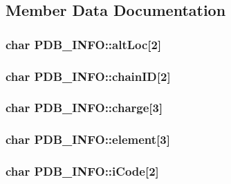 \subsection{Member Data Documentation}
\hypertarget{struct_p_d_b___i_n_f_o_aa6e2a1bcb191da4a47abb0220d3d5495}{
\subsubsection[{alt\-Loc}]{\setlength{\rightskip}{0pt plus 5cm}char P\-D\-B\-\_\-\-I\-N\-F\-O\-::alt\-Loc\mbox{[}2\mbox{]}}}\label{struct_p_d_b___i_n_f_o_aa6e2a1bcb191da4a47abb0220d3d5495}
\hypertarget{struct_p_d_b___i_n_f_o_ac3c03f7d131843da7fce185b73ee5d8d}{
\subsubsection[{chain\-I\-D}]{\setlength{\rightskip}{0pt plus 5cm}char P\-D\-B\-\_\-\-I\-N\-F\-O\-::chain\-I\-D\mbox{[}2\mbox{]}}}\label{struct_p_d_b___i_n_f_o_ac3c03f7d131843da7fce185b73ee5d8d}
\hypertarget{struct_p_d_b___i_n_f_o_a071b12c5f401b4d4328480c92f3e8757}{
\subsubsection[{charge}]{\setlength{\rightskip}{0pt plus 5cm}char P\-D\-B\-\_\-\-I\-N\-F\-O\-::charge\mbox{[}3\mbox{]}}}\label{struct_p_d_b___i_n_f_o_a071b12c5f401b4d4328480c92f3e8757}
\hypertarget{struct_p_d_b___i_n_f_o_a76a5f6c1f8c95f001c8724948a7d4711}{
\subsubsection[{element}]{\setlength{\rightskip}{0pt plus 5cm}char P\-D\-B\-\_\-\-I\-N\-F\-O\-::element\mbox{[}3\mbox{]}}}\label{struct_p_d_b___i_n_f_o_a76a5f6c1f8c95f001c8724948a7d4711}
\hypertarget{struct_p_d_b___i_n_f_o_a95010d5a6d18406f09cb2e1f66134ead}{
\subsubsection[{i\-Code}]{\setlength{\rightskip}{0pt plus 5cm}char P\-D\-B\-\_\-\-I\-N\-F\-O\-::i\-Code\mbox{[}2\mbox{]}}}\label{struct_p_d_b___i_n_f_o_a95010d5a6d18406f09cb2e1f66134ead}
